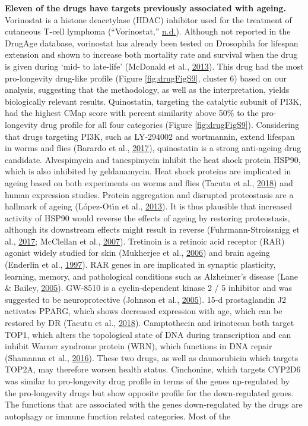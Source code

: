 \documentclass[12pt,twoside]{unicam}
\begin{document}
\textbf{Eleven of the drugs have targets previously associated with ageing.} Vorinostat is a histone deacetylase (HDAC) inhibitor used for the treatment of cutaneous T-cell lymphoma (``Vorinostat,'' \protect\hyperlink{ref-vorinostat}{n.d.}). Although not reported in the DrugAge database, vorinostat has already been tested on Drosophila for lifespan extension and shown to increase both mortality rate and survival when the drug is given during `mid- to late-life' (McDonald et al., \protect\hyperlink{ref-McDonald2013}{2013}). This drug had the most pro-longevity drug-like profile (Figure \ref{fig:drugFigS9}, cluster 6) based on our analysis, suggesting that the methodology, as well as the interpretation, yields biologically relevant results. Quinostatin, targeting the catalytic subunit of PI3K, had the highest CMap score with percent similarity above 50\% to the pro-longevity drug profile for all four categories (Figure \ref{fig:drugFigS9}). Considering that drugs targeting PI3K, such as LY-294002 and wortmannin, extend lifespan in worms and flies (Barardo et al., \protect\hyperlink{ref-Barardo2017}{2017}), quinostatin is a strong anti-ageing drug candidate. Alvespimycin and tanespimycin inhibit the heat shock protein HSP90, which is also inhibited by geldanamycin. Heat shock proteins are implicated in ageing based on both experiments on worms and flies (Tacutu et al., \protect\hyperlink{ref-Tacutu2018}{2018}) and human expression studies. Protein aggregation and disrupted proteostasis are a hallmark of ageing (López-Otı́n et al., \protect\hyperlink{ref-Lopez-Otin2013}{2013}). It is thus plausible that increased activity of HSP90 would reverse the effects of ageing by restoring proteostasis, although its downstream effects might result in reverse (Fuhrmann-Stroissnigg et al., \protect\hyperlink{ref-Fuhrmann-Stroissnigg2017}{2017}; McClellan et al., \protect\hyperlink{ref-McClellan2007}{2007}). Tretinoin is a retinoic acid receptor (RAR) agonist widely studied for skin (Mukherjee et al., \protect\hyperlink{ref-Mukherjee2006}{2006}) and brain ageing (Enderlin et al., \protect\hyperlink{ref-Enderlin1997}{1997}). RAR genes in are implicated in synaptic plasticity, learning, memory, and pathological conditions such as Alzheimer's disease (Lane \& Bailey, \protect\hyperlink{ref-Lane2005}{2005}). GW-8510 is a cyclin-dependent kinase 2 / 5 inhibitor and was suggested to be neuroprotective (Johnson et al., \protect\hyperlink{ref-Johnson2005}{2005}). 15-d prostaglandin J2 activates PPARG, which shows decreased expression with age, which can be restored by DR (Tacutu et al., \protect\hyperlink{ref-Tacutu2018}{2018}). Camptothecin and irinotecan both target TOP1, which alters the topological state of DNA during transcription and can inhibit Warner syndrome protein (WRN), which functions in DNA repair (Shamanna et al., \protect\hyperlink{ref-Shamanna2016}{2016}). These two drugs, as well as daunorubicin which targets TOP2A, may therefore worsen health status. Cinchonine, which targets CYP2D6 was similar to pro-longevity drug profile in terms of the genes up-regulated by the pro-longevity drugs but show opposite profile for the down-regulated genes. The functions that are associated with the genes down-regulated by the drugs are autophagy or immune function related categories. Most of the 
\end{document}

